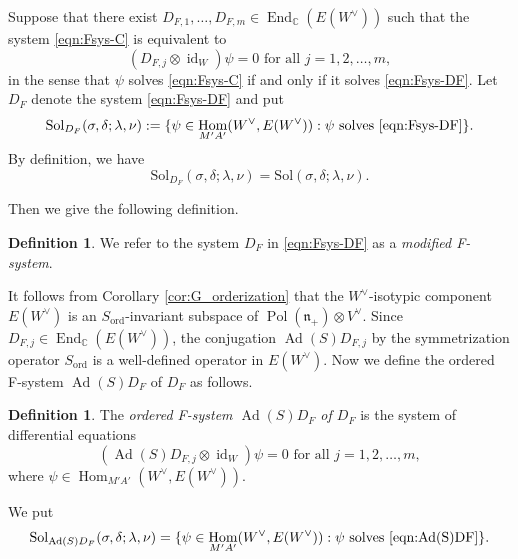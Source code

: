 \documentclass[a4paper,11pt,reqno]{amsart}
\newcommand{\frakn}{\mathfrak{n}}
\newcommand{\0}{{\bf 0}}
\newcommand{\C}{\mathbb{C}}
\newcommand{\1}{{\bf 1}}
\DeclareMathOperator{\Ad}{Ad}
\DeclareMathOperator{\End}{End}
\DeclareMathOperator{\Hom}{Hom}
\DeclareMathOperator{\Pol}{Pol}
\DeclareMathOperator{\id}{id}
\newcommand{\ord}{{\mathrm{ord}}}
\theoremstyle{plain}
\theoremstyle{definition}
\newtheorem{definition}[equation]{Definition}
\numberwithin{equation}{section}
\theoremstyle{definition}
\begin{document}
Suppose that there exist $D_{F,1}, \ldots, D_{F,m} \in \End_\C(E(W^\vee))$
such that the system \eqref{eqn:Fsys-C} 
is equivalent to
\begin{equation}\label{eqn:Fsys-DF}
(D_{F,j} \otimes \id_W)\psi=0
\,\,
\text{for all $j=1,2,\ldots,m$},
\end{equation}
in the sense that $\psi$ solves \eqref{eqn:Fsys-C} if and only if 
it solves \eqref{eqn:Fsys-DF}.
Let $D_F$ denote the system \eqref{eqn:Fsys-DF} and put
\begin{equation*}
\mathrm{Sol}_{D_F}(\sigma,\delta;\lambda,\nu)
:=\{ \psi \in \Hom_{M'A'}(W^\vee, E(W^\vee)): 
\text{$\psi$ solves \eqref{eqn:Fsys-DF}}\}.
\end{equation*}
By definition, we have 
\begin{equation*}
\mathrm{Sol}_{D_F}(\sigma,\delta;\lambda,\nu)=
\mathrm{Sol}(\sigma,\delta;\lambda,\nu).
\end{equation*}

Then we give the following definition.

\begin{definition}\label{def:modified-Fsystem}
We refer to the system $D_F$ in \eqref{eqn:Fsys-DF} 
as a \emph{modified F-system}.    
\end{definition}

It follows from Corollary \ref{cor:G_orderization} that 
the $W^\vee$-isotypic component $E(W^\vee)$ is an 
$S_\ord$-invariant subspace of $\Pol(\frakn_+) \otimes V^\vee$.
Since $D_{F,j} \in \End_{\C}(E(W^\vee))$, 
the conjugation $\Ad(S)D_{F,j}$ by the symmetrization operator 
$S_{\ord}$ is a well-defined operator in $E(W^\vee)$.
Now we define the ordered F-system $\Ad(S)D_F$ of $D_F$
as follows.

\begin{definition}
The \emph{ordered F-system $\Ad(S)D_F$ of $D_F$}
is the system of differential equations
\begin{equation}\label{eqn:Ad(S)DF}
(\Ad(S)D_{F,j} \otimes \id_W)\psi=0
\,\,
\text{for all $j=1,2,\ldots,m$},
\end{equation}
where $\psi \in \Hom_{M'A'}(W^\vee, E(W^\vee))$.
\end{definition}

We put
\begin{equation*}
\mathrm{Sol}_{\Ad(S)D_F}(\sigma,\delta;\lambda,\nu) 
=\{ \psi \in \Hom_{M'A'}(W^\vee, E(W^\vee)): 
\text{$\psi$ solves \eqref{eqn:Ad(S)DF}}\}.
\end{equation*}
\end{document}
